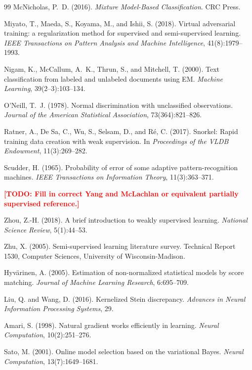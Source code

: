 \documentclass[11pt]{article}
\theoremstyle{definition}
\newcommand{\todo}[1]{\textcolor{red}{\textbf{[TODO: #1]}}}
\begin{document}
\begin{thebibliography}{99}
McNicholas, P.~D. (2016).
\textit{Mixture Model-Based Classification}.
CRC Press.

Miyato, T., Maeda, S., Koyama, M., and Ishii, S. (2018).
Virtual adversarial training: a regularization method for supervised and
semi-supervised learning.
\textit{IEEE Transactions on Pattern Analysis and Machine Intelligence},
41(8):1979--1993.

Nigam, K., McCallum, A.~K., Thrun, S., and Mitchell, T. (2000).
Text classification from labeled and unlabeled documents using EM.
\textit{Machine Learning}, 39(2--3):103--134.

O'Neill, T.~J. (1978).
Normal discrimination with unclassified observations.
\textit{Journal of the American Statistical Association}, 73(364):821--826.

Ratner, A., De Sa, C., Wu, S., Selsam, D., and R\'{e}, C. (2017).
Snorkel: Rapid training data creation with weak supervision.
In \textit{Proceedings of the VLDB Endowment}, 11(3):269--282.

Scudder, H. (1965).
Probability of error of some adaptive pattern-recognition machines.
\textit{IEEE Transactions on Information Theory}, 11(3):363--371.

\todo{Fill in correct Yang and McLachlan or equivalent partially supervised reference.}

Zhou, Z.-H. (2018).
A brief introduction to weakly supervised learning.
\textit{National Science Review}, 5(1):44--53.

Zhu, X. (2005).
Semi-supervised learning literature survey.
Technical Report 1530, Computer Sciences, University of Wisconsin-Madison.

Hyv\"{a}rinen, A. (2005).
Estimation of non-normalized statistical models by score matching.
\textit{Journal of Machine Learning Research}, 6:695--709.

Liu, Q. and Wang, D. (2016).
Kernelized Stein discrepancy.
\textit{Advances in Neural Information Processing Systems}, 29.

Amari, S. (1998).
Natural gradient works efficiently in learning.
\textit{Neural Computation}, 10(2):251--276.

Sato, M. (2001).
Online model selection based on the variational Bayes.
\textit{Neural Computation}, 13(7):1649--1681.

\end{thebibliography}
\end{document}
